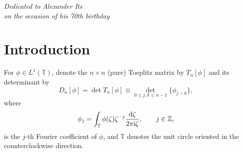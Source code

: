 \documentclass[pdftex]{sigma}
\numberwithin{equation}{section}
\newcommand{\Z}{{\mathbb Z}}
\newcommand{\T}{{\mathbb T}}
\newcommand{\ze}{\zeta}
\newcommand{\ii}{{\rm i}}
\newcommand{\dd}{{\rm d}}
\begin{document}


\begin{flushright}
\begin{minipage}{60mm}
\it Dedicated to Alexander Its\\ on the occasion of his 70th birthday
\end{minipage}
\end{flushright}

\tableofcontents

\renewcommand{\thefootnote}{\arabic{footnote}}
\setcounter{footnote}{0}

\section{Introduction}
For $\phi \in L^1(\T)$, denote the $n \times n$ (pure) Toeplitz matrix by $T_n[\phi]$ and its determinant by
\begin{equation}\label{ToeplitzDet}
	D_n[\phi] = \det T_n[\phi] \equiv \underset{0 \leq j,k\leq n-1}{\det} \{ \phi_{j-k} \},
\end{equation}
where \begin{equation*}
	\phi_j = \int_{\T} \phi(\ze)\ze^{-j} \frac{\dd \ze}{2 \pi \ii \ze}, \qquad j \in \Z,
\end{equation*}
is the $j$-th Fourier coefficient of $\phi$, and $\T$ denotes the unit circle oriented in the counterclockwise direction.
\end{document}
